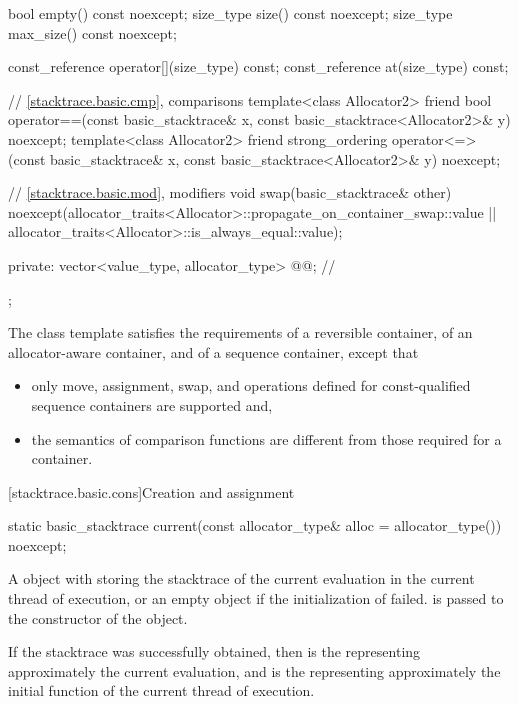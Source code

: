 \begin{codeblock}
{{    bool empty() const noexcept;
    size_type size() const noexcept;
    size_type max_size() const noexcept;

    const_reference operator[](size_type) const;
    const_reference at(size_type) const;

    // \ref{stacktrace.basic.cmp}, comparisons
    template<class Allocator2>
    friend bool operator==(const basic_stacktrace& x,
                           const basic_stacktrace<Allocator2>& y) noexcept;
    template<class Allocator2>
    friend strong_ordering operator<=>(const basic_stacktrace& x,
                                       const basic_stacktrace<Allocator2>& y) noexcept;

    // \ref{stacktrace.basic.mod}, modifiers
    void swap(basic_stacktrace& other)
      noexcept(allocator_traits<Allocator>::propagate_on_container_swap::value ||
        allocator_traits<Allocator>::is_always_equal::value);

  private:
    vector<value_type, allocator_type> @@;         // \expos
  };
}
\end{codeblock}

\pnum
The class template  satisfies
the requirements
of a reversible container,
of an allocator-aware container, and
of a sequence container,
except that
\begin{itemize}
\item
only move, assignment, swap, and
operations defined for const-qualified sequence containers are supported and,
\item
the semantics of comparison functions
are different from those required for a container.
\end{itemize}

[stacktrace.basic.cons]{Creation and assignment}

%
\begin{itemdecl}
static basic_stacktrace current(const allocator_type& alloc = allocator_type()) noexcept;
\end{itemdecl}

\begin{itemdescr}
\pnum
\returns
A  object
with  storing
the stacktrace of the current evaluation in the current thread of execution, or
an empty  object
if the initialization of  failed.
 is passed to the constructor of the  object.

\begin{note}
If the stacktrace was successfully obtained,
then  is the 
representing approximately the current evaluation, and
 is the 
representing approximately the initial function of
the current thread of execution.
\end{note}
\end{itemdescr}

